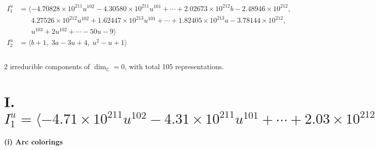 \documentclass[1p]{elsarticle_modified}
\theoremstyle{definition}
\begin{document}
\begin{align*}
I^u_{1}&=\langle 
-4.70828\times10^{211} u^{102}-4.30580\times10^{211} u^{101}+\cdots+2.02673\times10^{212} b-2.48946\times10^{212},\\
\phantom{I^u_{1}}&\phantom{= \langle  }4.27526\times10^{212} u^{102}+1.62447\times10^{213} u^{101}+\cdots+1.82405\times10^{213} a-3.78144\times10^{212},\\
\phantom{I^u_{1}}&\phantom{= \langle  }u^{103}+2 u^{102}+\cdots-50 u-9\rangle \\
I^u_{2}&=\langle 
b+1,\;3 a-3 u+4,\;u^2- u+1\rangle \\
\\
\end{align*}
\raggedright * 2 irreducible components of $\dim_{\mathbb{C}}=0$, with total 105 representations.\\
\newpage
\renewcommand{\arraystretch}{1}
\centering \section*{I. $I^u_{1}= \langle -4.71\times10^{211} u^{102}-4.31\times10^{211} u^{101}+\cdots+2.03\times10^{212} b-2.49\times10^{212},\;4.28\times10^{212} u^{102}+1.62\times10^{213} u^{101}+\cdots+1.82\times10^{213} a-3.78\times10^{212},\;u^{103}+2 u^{102}+\cdots-50 u-9 \rangle$}
\flushleft \textbf{(i) Arc colorings}\\
\end{document}
